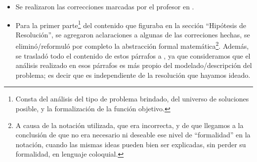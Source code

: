 \documentclass[11pt, a4paper, twoside]{article}
\begin{document}
\begin{itemize}[leftmargin=+4em]

    \item Se realizaron las correcciones marcadas por el profesor en
.

    \item Para la primer parte\footnote{ Consta del análisis del tipo de
problema brindado, del universo de soluciones posible, y la formalización de la
función objetivo.} del contenido que figuraba en la sección ``Hipótesis de
Resolución'', se agregaron aclaraciones a algunas de las correciones hechas, se
eliminó/reformuló por completo la abstracción formal matemática\footnote{ A
causa de la notación utilizada, que era incorrecta, y de que llegamos a la
conclusión de que no era necesario ni deseable ese nivel de ``formalidad'' en la
notación, cuando las mismas ideas pueden bien ser explicadas, sin perder su
formalidad, en lenguaje coloquial.}. Además, se trasladó todo el contenido de
estos párrafos a , ya que consideramos que
el análisis realizado en esos párrafos es más propio del modelado/descripción
del problema; es decir que es independiente de la resolución que hayamos ideado.

\end{itemize}

\end{document}
